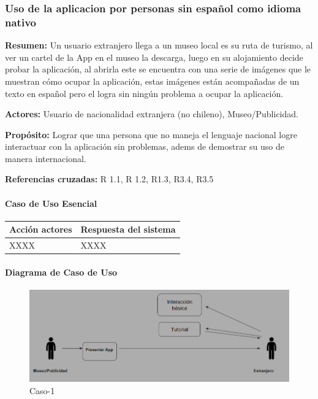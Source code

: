 \subsubsection{Uso de la aplicacion por personas sin español como idioma nativo}

{\textbf {Resumen:}}
Un usuario extranjero llega a un museo local es su ruta de turismo, al ver un cartel de la App en el museo la descarga, luego en su alojamiento decide probar la aplicación, al abrirla este se encuentra con una serie de imágenes que le muestran cómo ocupar la aplicación, estas imágenes están acompañadas de un texto en español pero el logra sin ningún problema a ocupar la aplicación.

{\textbf {Actores:}}
Usuario de nacionalidad extranjera (no chileno), Museo/Publicidad.

{\textbf {Propósito:}}
Lograr que una persona que no maneja el lenguaje nacional logre interactuar con la aplicación sin problemas, adems de demostrar su uso de manera internacional.

{\textbf {Referencias cruzadas:}}
R 1.1, R 1.2, R1.3, R3.4, R3.5

\paragraph{Caso de Uso Esencial}

\begin{longtable}{|p{5cm}|p{8cm}|}
\hline 
Acción actores & Respuesta del sistema \\ 
\hline 
XXXX & XXXX \\ 
\hline 
\end{longtable}

\paragraph{Diagrama de Caso de Uso}

\begin{figure}[H]
\centerline{\includegraphics[width=15cm]{imgs/CasoUso_2.PNG}}
\caption{Caso-1}
\label{fig}
\end{figure}

